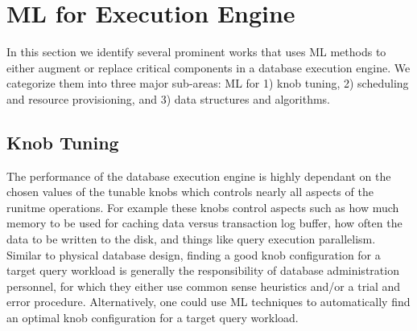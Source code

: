 \section{ML for Execution Engine}
In this section we identify several prominent works that uses ML methods to either augment or replace critical components in a database execution engine.
We categorize them into three major sub-areas: ML for 1) knob tuning, 2) scheduling and resource provisioning, and 3) data structures and algorithms.

\subsection{Knob Tuning}
The performance of the database execution engine is highly dependant on the chosen values of the tunable knobs which controls nearly all aspects of the runitme operations.
For example these knobs control aspects such as how much memory to be used for caching data versus transaction log buffer, how often the data to be written to the disk, and things like query execution parallelism.
Similar to physical database design, finding a good knob configuration for a target query workload is generally the responsibility of database administration personnel, for which they either use common sense heuristics and/or a trial and error procedure.
Alternatively, one could use ML techniques to automatically find an optimal knob configuration for a target query workload.

